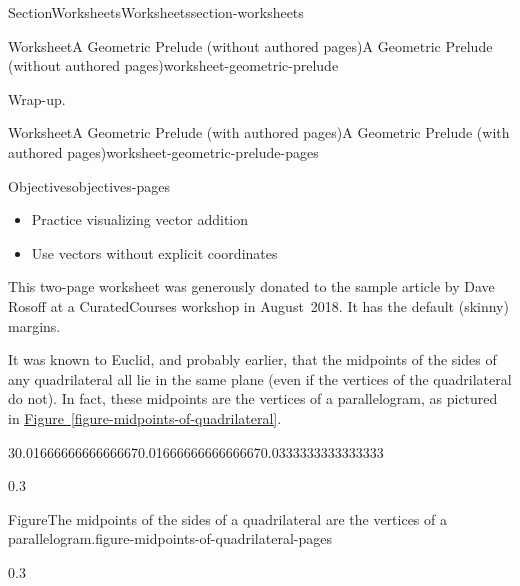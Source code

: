 \documentclass[twoside,10pt,]{article}
\newcommand{\xreffont}{\relax}
\numberwithin{equation}{section}
\begin{document}
\begin{sectionptx}{Section}{Worksheets}{}{Worksheets}{}{}{section-worksheets}
\begin{worksheet-subsection}{Worksheet}{A Geometric Prelude (without authored pages)}{}{A Geometric Prelude (without authored pages)}{}{}{worksheet-geometric-prelude}
\begin{conclusion}{Wrap-up.}
\end{conclusion}%
\end{worksheet-subsection}
\restoregeometry
%
%
\typeout{************************************************}
\typeout{************************************************}
%
\begin{worksheet-subsection}{Worksheet}{A Geometric Prelude (with authored pages)}{}{A Geometric Prelude (with authored pages)}{}{}{worksheet-geometric-prelude-pages}
\begin{objectives}{Objectives}{objectives-pages}
%
\begin{itemize}[label=\textbullet]
\item{}Practice visualizing vector addition%
\item{}Use vectors without explicit coordinates%
\end{itemize}
\end{objectives}
\begin{introduction}{}%
This two-page worksheet was generously donated to the sample article by Dave Rosoff at a CuratedCourses workshop in August~2018.  It has the default (skinny) margins.%
\par
It was known to Euclid, and probably earlier, that the midpoints of the sides of any quadrilateral all lie in the same plane (even if the vertices of the quadrilateral do not). In fact, these midpoints are the vertices of a parallelogram, as pictured in \hyperref[figure-midpoints-of-quadrilateral]{Figure~{\xreffont\ref{figure-midpoints-of-quadrilateral}}}.%
\begin{sidebyside}{3}{0.0166666666666667}{0.0166666666666667}{0.0333333333333333}%
\begin{sbspanel}{0.3}%
\begin{panelfigureptx}{Figure}{The midpoints of the sides of a quadrilateral are the vertices of a parallelogram.}{figure-midpoints-of-quadrilateral-pages}{}%
\noindent{}%
\tcblower
\end{panelfigureptx}%
\end{sbspanel}%
\begin{sbspanel}{0.3}%

\end{sbspanel}
\end{sidebyside}
\end{introduction}
\end{worksheet-subsection}
\end{sectionptx}
\end{document}
